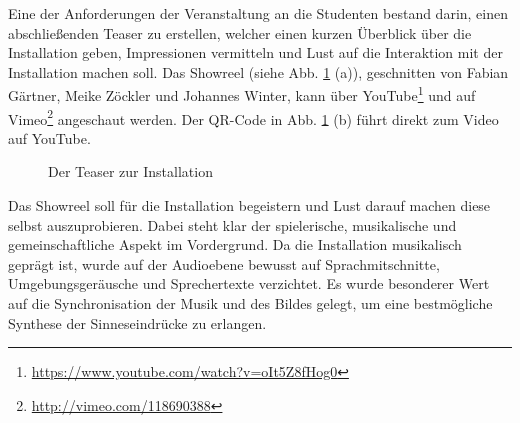 
Eine der Anforderungen der Veranstaltung an die Studenten bestand darin, einen abschließenden Teaser zu erstellen, welcher einen kurzen Überblick über die Installation geben, Impressionen vermitteln und Lust auf die Interaktion mit der Installation machen soll. Das Showreel (siehe Abb. \ref{fig:teaser} (a)), geschnitten von Fabian Gärtner, Meike Zöckler und Johannes Winter, kann über YouTube\footnote{\url{https://www.youtube.com/watch?v=oIt5Z8fHog0}} und auf Vimeo\footnote{\url{http://vimeo.com/118690388}} angeschaut werden. Der QR-Code in Abb. \ref{fig:teaser} (b) führt direkt zum Video auf YouTube.

\begin{figure}[htbp]
\hfill
{}
\caption{Der Teaser zur Installation}
\label{fig:teaser}
\end{figure}

Das Showreel soll für die Installation begeistern und Lust darauf machen diese selbst auszuprobieren. Dabei steht klar der spielerische, musikalische und gemeinschaftliche Aspekt im Vordergrund. Da die Installation musikalisch geprägt ist, wurde auf der Audioebene bewusst auf Sprachmitschnitte, Umgebungsgeräusche und Sprechertexte verzichtet. Es wurde besonderer Wert auf die Synchronisation der Musik und des Bildes gelegt, um eine bestmögliche Synthese der Sinneseindrücke zu erlangen.

